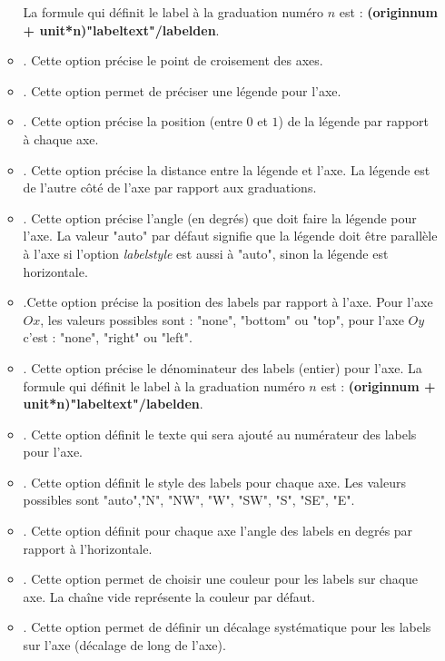 \begin{itemize}
\begin{itemize}
            La formule qui définit le label à la graduation numéro $n$ est : \textbf{(originnum + unit*n)"labeltext"/labelden}.
            \item {}. Cette option précise le point de croisement des axes.
            \item {}. Cette option permet de préciser une légende pour l'axe.
            \item {}. Cette option précise la position (entre $0$ et $1$) de la légende par rapport à chaque axe.
            \item {}. Cette option précise la distance entre la légende et l'axe. La légende est de l'autre côté de l'axe par rapport aux graduations.
            \item {}. Cette option précise l'angle (en degrés) que doit faire la légende pour l'axe. La valeur "auto" par défaut signifie que la légende doit être parallèle à l'axe si l'option \emph{labelstyle} est aussi à "auto", sinon la légende est horizontale.
            \item {}.Cette option précise la position des labels par rapport à l'axe. Pour l'axe $Ox$, les valeurs possibles sont : "none", "bottom" ou "top", pour l'axe $Oy$ c'est :  "none", "right" ou "left".
            \item {}. Cette option précise le dénominateur des labels (entier) pour l'axe. La formule qui définit le label à la graduation numéro $n$ est : \textbf{(originnum + unit*n)"labeltext"/labelden}.
            \item {}. Cette option définit le texte qui sera ajouté au numérateur des labels pour l'axe.
            \item {}. Cette option définit le style des labels pour chaque axe. Les valeurs possibles sont "auto","N", "NW", "W", "SW", "S", "SE", "E".
            \item {}. Cette option définit pour chaque axe l'angle des labels en degrés par rapport à l'horizontale.
            \item {}. Cette option permet de choisir une couleur pour les labels sur chaque axe. La chaîne vide représente la couleur par défaut.
            \item {}. Cette option permet de définir un décalage systématique pour les labels sur l'axe (décalage de long de l'axe).

\end{itemize}
\end{itemize}
